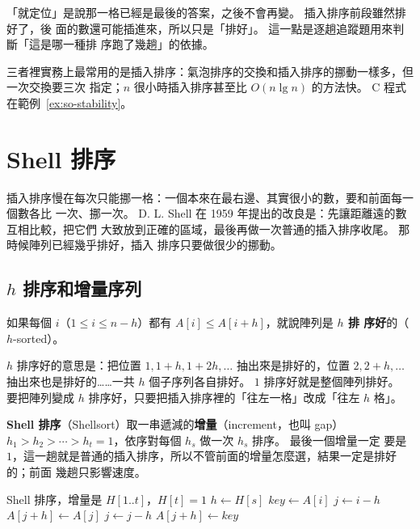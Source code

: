 「就定位」是說那一格已經是最後的答案，之後不會再變。 插入排序前段雖然排好了，後
面的數還可能插進來，所以只是「排好」。 這一點是逐趟追蹤題用來判斷「這是哪一種排
序跑了幾趟」的依據。

三者裡實務上最常用的是插入排序：氣泡排序的交換和插入排序的挪動一樣多，但一次交換要三次
指定；$n$ 很小時插入排序甚至比 $O(n \lg n)$ 的方法快。 C 程式在範例~\ref{ex:so-stability}。

\section{Shell 排序}
\label{sec:so-shell}

插入排序慢在每次只能挪一格：一個本來在最右邊、其實很小的數，要和前面每一個數各比
一次、挪一次。 D. L. Shell 在 1959 年提出的改良是：先讓距離遠的數互相比較，把它們
大致放到正確的區域，最後再做一次普通的插入排序收尾。 那時候陣列已經幾乎排好，插入
排序只要做很少的挪動。

\subsection{$h$ 排序和增量序列}

\begin{definition}[$h$ 排序好]
\label{def:so-hsorted}
如果每個 $i$（$1 \le i \le n - h$）都有 $A[i] \le A[i + h]$，就說陣列是 \textbf{$h$ 排
序好}的（$h$-sorted）。
\end{definition}

$h$ 排序好的意思是：把位置 $1, 1 + h, 1 + 2h, \ldots$ 抽出來是排好的，位置 $2, 2 + h,
\ldots$ 抽出來也是排好的……一共 $h$ 個子序列各自排好。 $1$ 排序好就是整個陣列排好。
要把陣列變成 $h$ 排序好，只要把插入排序裡的「往左一格」改成「往左 $h$ 格」。

\textbf{Shell 排序}（Shellsort）取一串遞減的\textbf{增量}（increment，也叫 gap）
$h_1 > h_2 > \cdots > h_t = 1$，依序對每個 $h_s$ 做一次 $h_s$ 排序。 最後一個增量一定
要是 $1$，這一趟就是普通的插入排序，所以不管前面的增量怎麼選，結果一定是排好的；前面
幾趟只影響速度。

\begin{pseudo}[label=alg:so-shell, unbreakable]{Shell 排序，增量是 $H[1..t]$，$H[t] = 1$}
        \State $h \gets H[s]$
         
            \State $\mathit{key} \gets A[i]$
            \State $j \gets i - h$
                \State $A[j + h] \gets A[j]$
                \State $j \gets j - h$
            \EndWhile
            \State $A[j + h] \gets \mathit{key}$
        \EndFor
    \EndFor
\EndProcedure
\end{pseudo}

